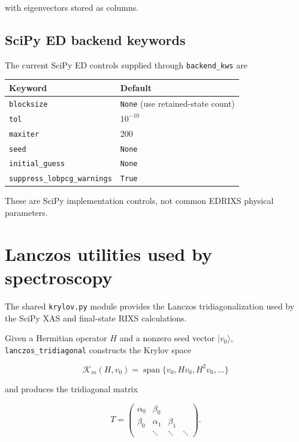 \documentclass[11pt]{article}
\begin{document}
with eigenvectors stored as columns.

\subsection{SciPy ED backend keywords}

The current SciPy ED controls supplied through \texttt{backend\_kws} are

\begin{center}
\begin{tabular}{ll}
\toprule
Keyword & Default \\
\midrule
\texttt{blocksize} & \texttt{None} (use retained-state count) \\
\texttt{tol} & \(10^{-10}\) \\
\texttt{maxiter} & 200 \\
\texttt{seed} & \texttt{None} \\
\texttt{initial\_guess} & \texttt{None} \\
\texttt{suppress\_lobpcg\_warnings} & \texttt{True} \\
\bottomrule
\end{tabular}
\end{center}

These are SciPy implementation controls, not common EDRIXS physical parameters.

\section{Lanczos utilities used by spectroscopy}

The shared \texttt{krylov.py} module provides the Lanczos tridiagonalization used by the SciPy XAS and final-state RIXS calculations.

Given a Hermitian operator \(H\) and a nonzero seed vector \(|v_0\rangle\), \texttt{lanczos\_tridiagonal} constructs the Krylov space

\begin{equation}
  \mathcal K_m(H,v_0)=\operatorname{span}\{v_0,Hv_0,H^2v_0,\ldots\}
\end{equation}

and produces the tridiagonal matrix

\begin{equation}
  T = \begin{pmatrix}
  \alpha_0 & \beta_0 \\
  \beta_0 & \alpha_1 & \beta_1 \\
  & \ddots & \ddots & \ddots
  \end{pmatrix}.
\end{equation}
\end{document}
